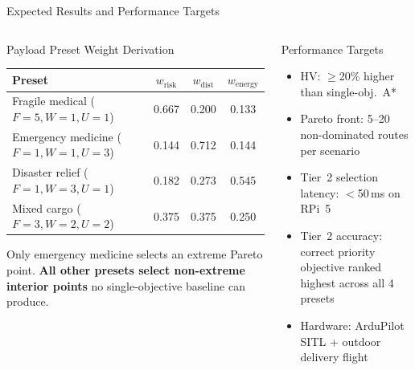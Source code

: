 \documentclass[aspectratio=169,11pt]{beamer}
\begin{document}
\begin{frame}{Expected Results and Performance Targets}
  \begin{columns}[T,onlytextwidth]
      \begin{block}{Payload Preset Weight Derivation}
        \scriptsize
        \begin{tabularx}{\linewidth}{Y c c c}
          \toprule
          \textbf{Preset} &
          $w_\mathrm{risk}$ & $w_\mathrm{dist}$ & $w_\mathrm{energy}$\\
          \midrule
          Fragile medical ($F{=}5,W{=}1,U{=}1$)
            & 0.667 & 0.200 & 0.133\\
          Emergency medicine ($F{=}1,W{=}1,U{=}3$)
            & 0.144 & 0.712 & 0.144\\
          Disaster relief ($F{=}1,W{=}3,U{=}1$)
            & 0.182 & 0.273 & 0.545\\
          Mixed cargo ($F{=}3,W{=}2,U{=}2$)
            & 0.375 & 0.375 & 0.250\\
          \bottomrule
        \end{tabularx}
        \vspace{0.04cm}
        Only emergency medicine selects an extreme Pareto point.
        \textbf{All other presets select non-extreme interior points} no
        single-objective baseline can produce.
      \end{block}
      \begin{block}{Performance Targets}
        \begin{itemize}
          \item HV: $\geq$20\% higher than single-obj.\ A*
          \item Pareto front: 5--20 non-dominated routes per scenario
          \item Tier~2 selection latency: $<$50\,ms on RPi~5
          \item Tier~2 accuracy: correct priority objective ranked highest
                across all 4 presets
          \item Hardware: ArduPilot SITL + outdoor delivery flight
        \end{itemize}
      \end{block}
  \end{columns}
  \vspace*{-3pt}
\end{frame}
\end{document}
